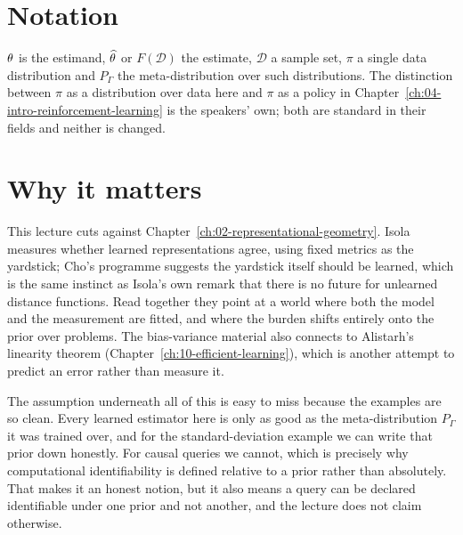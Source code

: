 \section*{Notation}

$\theta$ is the estimand, $\widehat{\theta}$ or $F(\mathcal{D})$ the estimate, $\mathcal{D}$ a
sample set, $\pi$ a single data distribution and $P_\Gamma$ the meta-distribution over such
distributions. The distinction between $\pi$ as a distribution over data here and $\pi$ as a
policy in Chapter~\ref{ch:04-intro-reinforcement-learning} is the speakers' own; both are
standard in their fields and neither is changed.

\section*{Why it matters}

This lecture cuts against Chapter~\ref{ch:02-representational-geometry}. Isola measures whether
learned representations agree, using fixed metrics as the yardstick; Cho's programme suggests
the yardstick itself should be learned, which is the same instinct as Isola's own remark that
there is no future for unlearned distance functions. Read together they point at a world where
both the model and the measurement are fitted, and where the burden shifts entirely onto the
prior over problems. The bias-variance material also connects to Alistarh's linearity theorem
(Chapter~\ref{ch:10-efficient-learning}), which is another attempt to predict an error rather
than measure it.

\begin{aside}
The assumption underneath all of this is easy to miss because the examples are so clean. Every learned
estimator here is only as good as the meta-distribution $P_\Gamma$ it was trained over, and
for the standard-deviation example we can write that prior down honestly. For causal queries
we cannot, which is precisely why computational identifiability is defined relative to a
prior rather than absolutely. That makes it an honest notion, but it also means a query can
be declared identifiable under one prior and not another, and the lecture does not claim
otherwise.
\end{aside}
